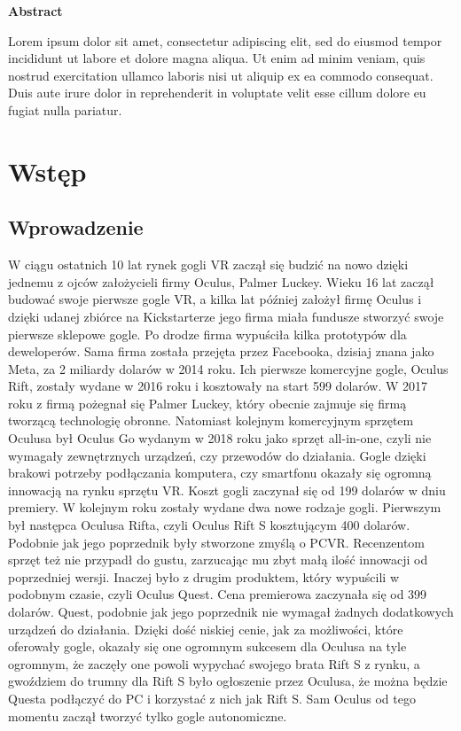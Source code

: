 \documentclass[a4paper,12pt,reqno]{article}
\begin{document}
\newpage
\begin{flushleft}
\Large \textbf{Abstract}
\end{flushleft}
\vspace{1cm}


Lorem ipsum dolor sit amet, consectetur adipiscing elit, sed do eiusmod tempor incididunt ut labore et dolore magna aliqua. Ut enim ad minim veniam, quis nostrud exercitation ullamco laboris nisi ut aliquip ex ea commodo consequat. Duis aute irure dolor in reprehenderit in voluptate velit esse cillum dolore eu fugiat nulla pariatur.

\newpage

\section{Wstęp}

\subsection{Wprowadzenie}

W ciągu ostatnich 10 lat rynek gogli VR zaczął się budzić na nowo dzięki jednemu z ojców założycieli firmy Oculus, Palmer Luckey. Wieku 16 lat zaczął budować swoje pierwsze gogle VR, a kilka lat później założył firmę Oculus i dzięki udanej zbiórce na Kickstarterze jego firma miała fundusze stworzyć swoje pierwsze sklepowe gogle. Po drodze firma wypuściła kilka prototypów dla deweloperów. Sama firma została przejęta przez Facebooka, dzisiaj znana jako Meta, za 2 miliardy dolarów w 2014 roku. Ich pierwsze komercyjne gogle, Oculus Rift, zostały wydane w 2016 roku i kosztowały na start 599 dolarów. W 2017 roku z firmą pożegnał się Palmer Luckey, który obecnie zajmuje się firmą tworzącą technologię obronne. Natomiast kolejnym komercyjnym sprzętem Oculusa był Oculus Go wydanym w 2018 roku jako sprzęt all-in-one, czyli nie wymagały zewnętrznych urządzeń, czy przewodów do działania. Gogle dzięki brakowi potrzeby podłączania komputera, czy smartfonu okazały się ogromną innowacją na rynku sprzętu VR. Koszt gogli zaczynał się od 199 dolarów w dniu premiery. W kolejnym roku zostały wydane dwa nowe rodzaje gogli. Pierwszym był następca Oculusa Rifta, czyli Oculus Rift S kosztującym 400 dolarów. Podobnie jak jego poprzednik były stworzone zmyślą o PCVR. Recenzentom sprzęt też nie przypadł do gustu, zarzucając mu zbyt małą ilość innowacji od poprzedniej wersji. Inaczej było z drugim produktem, który wypuścili w podobnym czasie, czyli Oculus Quest. Cena premierowa zaczynała się od 399 dolarów. Quest, podobnie jak jego poprzednik nie wymagał żadnych dodatkowych urządzeń do działania. Dzięki dość niskiej cenie, jak za możliwości, które oferowały gogle, okazały się one ogromnym sukcesem dla Oculusa na tyle ogromnym, że zaczęły one powoli wypychać swojego brata Rift S z rynku, a gwoździem do trumny dla Rift S było ogłoszenie przez Oculusa, że można będzie Questa podłączyć do PC i korzystać z nich jak Rift S. Sam Oculus od tego momentu zaczął tworzyć tylko gogle autonomiczne.
\end{document}

